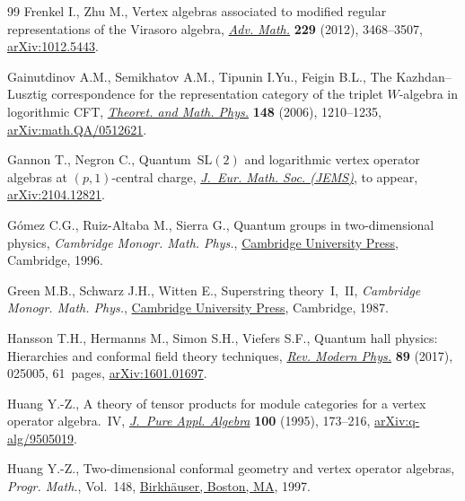 \documentclass[10pt,a4paper]{amsart}
\numberwithin{equation}{section}
\begin{document}
\begin{thebibliography}{99}
Frenkel I., Zhu M., Vertex algebras associated to modified regular
 representations of the {V}irasoro algebra,
 \href{https://doi.org/10.1016/j.aim.2012.02.008}{\textit{Adv. Math.}}
 \textbf{229} (2012), 3468--3507,
 \href{http://arxiv.org/abs/1012.5443}{arXiv:1012.5443}.

Gainutdinov A.M., Semikhatov A.M., Tipunin I.Yu., Feigin B.L., The
 {K}azhdan--{L}usztig correspondence for the representation category of the
 triplet {$W$}-algebra in logorithmic {CFT},
 \href{https://doi.org/10.1007/s11232-006-0113-6}{\textit{Theoret. and Math.
 Phys.}} \textbf{148} (2006), 1210--1235,
 \href{http://arxiv.org/abs/math.QA/0512621}{arXiv:math.QA/0512621}.

Gannon T., Negron C., Quantum~$\mathrm{SL}(2)$ and logarithmic vertex operator
 algebras at $(p,1)$-central charge,
 \href{https://doi.org/10.4171/JEMS/1489}{\textit{J.~Eur. Math. Soc. (JEMS)}},
{t}o appear,
 \href{http://arxiv.org/abs/2104.12821}{arXiv:2104.12821}.

G\'omez C.G., Ruiz-Altaba M., Sierra G., Quantum groups in two-dimensional
 physics, \textit{Cambridge Monogr. Math. Phys.},
 \href{https://doi.org/10.1017/CBO9780511628825}{Cambridge University Press}, Cambridge,
 1996.

Green M.B., Schwarz J.H., Witten E., Superstring theory~I,~II, \textit{Cambridge
 Monogr. Math. Phys.}, \href{https://doi.org/10.1002/asna.2113090428}{Cambridge
 University Press}, Cambridge, 1987.

Hansson T.H., Hermanns M., Simon S.H., Viefers S.F., Quantum hall physics: {H}ierarchies and conformal field theory techniques,
 \href{https://doi.org/10.1103/RevModPhys.89.025005}{\textit{Rev. Modern
 Phys.}} \textbf{89} (2017), 025005, 61~pages,
 \href{http://arxiv.org/abs/1601.01697}{arXiv:1601.01697}.

Huang Y.-Z., A theory of tensor products for module categories for a vertex
 operator algebra.~{IV},
 \href{https://doi.org/10.1016/0022-4049(95)00050-7}{\textit{J.~Pure Appl.
 Algebra}} \textbf{100} (1995), 173--216,
 \href{http://arxiv.org/abs/q-alg/9505019}{arXiv:q-alg/9505019}.

Huang Y.-Z., Two-dimensional conformal geometry and vertex operator algebras,
 \textit{Progr. Math.}, Vol.~148,
 \href{https://doi.org/10.1007/978-1-4612-4276-5}{Birkh\"auser, Boston, MA},
 1997.


\end{thebibliography}
\end{document}
